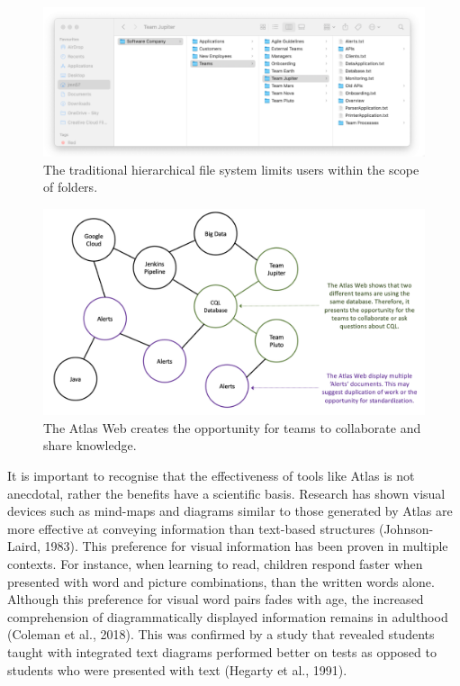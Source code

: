 \documentclass{article}
\begin{document}
\begin{figure}[!htb]
  \centering
      \includegraphics[width=1\textwidth]{images/filesystem-business-case.png}
  \caption{The traditional hierarchical file system limits users within the scope of folders.}
\end{figure}

\begin{figure}[!htb]
  \centering
      \includegraphics[width=1\textwidth]{images/benefits-of-web.png}
  \caption{The Atlas Web creates the opportunity for teams to collaborate and share knowledge.}
\end{figure}

It is important to recognise that the effectiveness of tools like Atlas is not anecdotal, rather the benefits have a scientific basis. Research has shown visual devices such as mind-maps and diagrams similar to those generated by Atlas are more effective at conveying information than text-based structures (Johnson-Laird, 1983). This preference for visual information has been proven in multiple contexts. For instance, when learning to read, children respond faster when presented with word and picture combinations, than the written words alone. Although this preference for visual word pairs fades with age, the increased comprehension of diagrammatically displayed information remains in adulthood (Coleman et al., 2018). This was confirmed by a study that revealed students taught with integrated text diagrams performed better on tests as opposed to students who were presented with text (Hegarty et al., 1991). 
\end{document}
